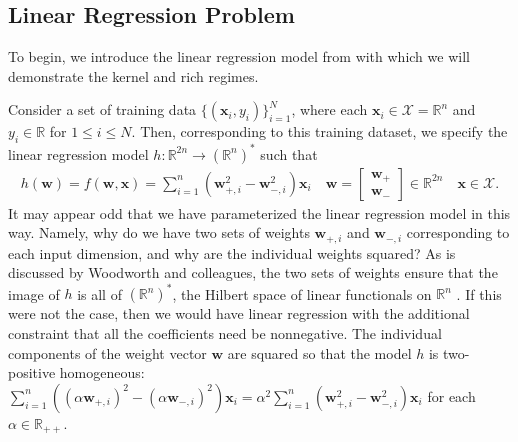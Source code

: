\documentclass{article}
\begin{document}
\subsection{Linear Regression Problem}\label{linregmodel}

To begin, we introduce the linear regression model from \cite{woodworth2020kernel} with which we will demonstrate the kernel and rich regimes.

Consider a set of training data $\{ (\boldsymbol{x}_i, y_i)\}_{i=1}^N$, where each $\boldsymbol{x}_i \in \mathcal{X} = \mathbb{R}^n$ and $y_i \in \mathbb{R}$ for $1 \leq i \leq N$. Then, corresponding to this training dataset, we specify the linear regression model $h: \mathbb{R}^{2n} \rightarrow (\mathbb{R}^n)^*$ such that
\begin{align}\label{linreg}
    h(\boldsymbol{w}) = f(\boldsymbol{w}, \boldsymbol{x}) = \sum_{i=1}^n(\boldsymbol{w}_{+, i}^2 - \boldsymbol{w}_{-, i}^2)\boldsymbol{x}_i \quad 
    \boldsymbol{w} = 
    \begin{bmatrix}
        \boldsymbol{w}_+ \\
        \boldsymbol{w}_-
    \end{bmatrix} 
    \in \mathbb{R}^{2n} \quad \boldsymbol{x} \in \mathcal{X}.
\end{align}
It may appear odd that we have parameterized the linear regression model in this way. Namely, why do we have two sets of weights $\boldsymbol{w}_{+, i}$ and $\boldsymbol{w}_{-, i}$ corresponding to each input dimension, and why are the individual weights squared? As is discussed by Woodworth and colleagues, the two sets of weights ensure that the image of $h$ is all of $(\mathbb{R}^n)^*$, the Hilbert space of linear functionals on $\mathbb{R}^n$ \cite{woodworth2020kernel}. If this were not the case, then we would have linear regression with the additional constraint that all the coefficients need be nonnegative. The individual components of the weight vector $\boldsymbol{w}$ are squared so that the model $h$ is two-positive homogeneous: $\sum_{i=1}^n((\alpha \boldsymbol{w}_{+, i})^2 - (\alpha \boldsymbol{w}_{-, i})^2)\boldsymbol{x}_i = \alpha^2\sum_{i=1}^n(\boldsymbol{w}_{+, i}^2 - \boldsymbol{w}_{-, i}^2)\boldsymbol{x}_i$ for each $\alpha \in \mathbb{R}_{++}$.
\end{document}
